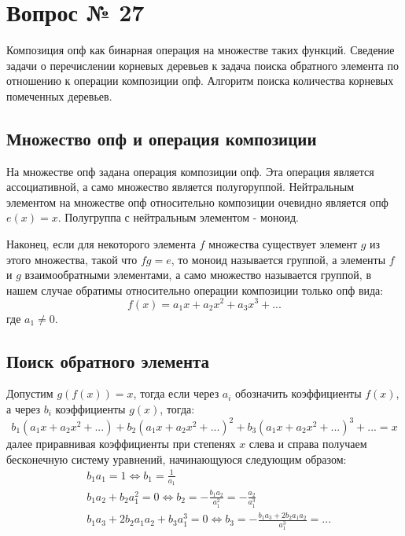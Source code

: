 \chapter{Вопрос № 27}

Композиция опф как бинарная операция на множестве таких функций. Сведение задачи о перечислении корневых деревьев к задача поиска обратного элемента по отношению к операции композиции опф. Алгоритм поиска количества корневых помеченных деревьев.

\section{Множество опф и операция композиции}

На множестве опф задана операция композиции опф. Эта операция является ассоциативной, а само множество является полугоруппой. Нейтральным элементом на множестве опф относительно композиции очевидно является опф $e\left(x\right) = x$. Полугруппа с нейтральным элементом - моноид.

Наконец, если для некоторого элемента $f$ множества существует элемент $g$ из этого множества, такой что $fg = e$, то моноид называется группой, а элементы $f$ и $g$ взаимообратными элементами, а само множество называется группой, в нашем случае обратимы относительно операции композиции только опф вида:
\[
	f\left(x\right) = a_1 x + a_2 x^2 + a_3 x^3 + ...
\]
где $a_1 \not= 0$.

\section{Поиск обратного элемента}

Допустим $g\left(f\left(x\right)\right) = x$, тогда если через $a_i$ обозначить коэффициенты $f\left(x\right)$, а через $b_i$ коэффициенты $g\left(x\right)$, тогда:
\[
	b_1\left(a_1x + a_2x^2 + ...\right) + b_2\left(a_1x + a_2x^2 + ... \right)^2 + b_3\left(a_1x+a_2x^2+ ...\right)^3 + ... = x
\]
далее приравнивая коэффициенты при степенях $x$ слева и справа получаем бесконечную систему уравнений, начинающуюся следующим образом:
\[
	\begin{split}
		& b_1a_1 = 1 \Leftrightarrow b_1 = \frac{1}{a_1} \\
		& b_1a_2 + b_2a_1^2 = 0 \Leftrightarrow b_2 = -\frac{b_1a_2}{a_1^2} = -\frac{a_2}{a_1^3} \\
		& b_1a_3 + 2b_2a_1a_2 + b_3a_1^3 = 0 \Leftrightarrow b_3 = -\frac{b_1a_3 + 2b_2a_1a_2}{a_1^3} = ...
	\end{split}
\]

